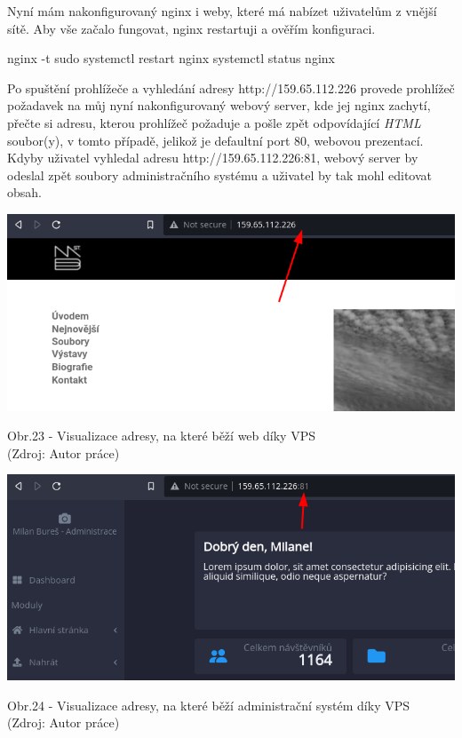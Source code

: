 \documentclass[12pt,a4paper]{report}
\begin{document}
  Nyní mám nakonfigurovaný nginx i weby, které má nabízet uživatelům z vnější sítě.
  Aby vše začalo fungovat, nginx restartuji a ověřím konfiguraci.
  \begin{bash}
    nginx -t
    sudo systemctl restart nginx
    systemctl status nginx
  \end{bash}

  Po spuštění prohlížeče a vyhledání adresy http://159.65.112.226 provede prohlížeč
  požadavek na můj nyní nakonfigurovaný webový server, kde jej nginx zachytí, přečte si adresu, kterou prohlížeč požaduje a 
  pošle zpět odpovídající \emph{HTML} soubor(y), v tomto případě, jelikož je defaultní port 80, webovou prezentací.
  Kdyby uživatel vyhledal adresu http://159.65.112.226:81, webový server by odeslal zpět soubory administračního systému a uživatel by tak mohl editovat 
  obsah.

  \vspace*{0.5cm}
  \noindent\includegraphics[width=\linewidth]{VPS_WEB.png}
  \begin{center}
    Obr.23 - Visualizace adresy, na které běží web díky VPS \\
    (Zdroj: Autor práce)
  \end{center}
  \vspace*{0.5cm}
  \vspace*{0.5cm}
  \noindent\includegraphics[width=\linewidth]{VPS_CMS.png}
  \begin{center}
    Obr.24 - Visualizace adresy, na které běží administrační systém díky VPS \\
    (Zdroj: Autor práce)
  \end{center}
  \vspace*{0.5cm}
\end{document}
